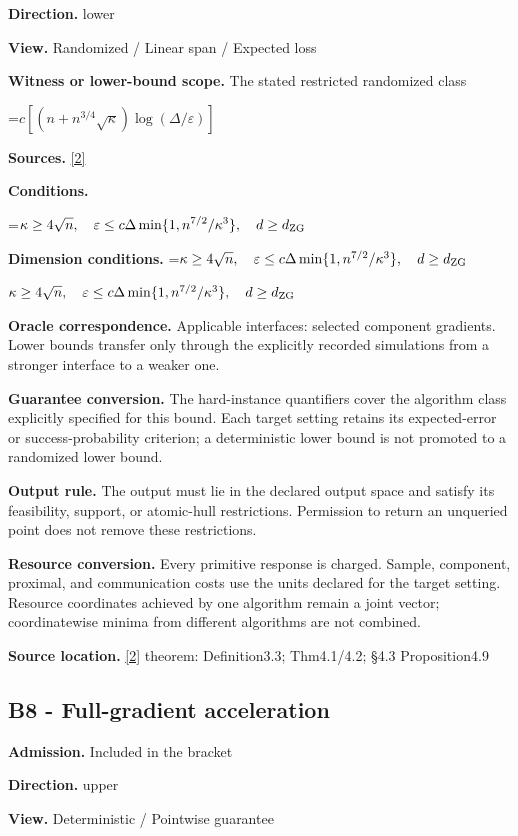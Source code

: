 \documentclass[10pt,a4paper]{article}
\newcommand{\AtlasMath}[1]{\par\begingroup\centering\setbox0=\hbox{$\displaystyle #1$}\ifdim\wd0>1.4\linewidth\typeout{ATLAS WIDE FORMULA: \the\wd0}\fi\ifdim\wd0>\linewidth\resizebox{\linewidth}{!}{\box0}\else\box0\fi\par\endgroup}
\newcommand{\AtlasInlineMath}[1]{\begingroup\setbox0=\hbox{$#1$}\ifdim\wd0>.4\linewidth\endgroup\AtlasMath{#1}\else\endgroup$#1$\fi}
\begin{document}
\textbf{Direction.} lower

\textbf{View.} Randomized / Linear span / Expected loss

\textbf{Witness or lower-bound scope.} The stated restricted randomized class

\AtlasMath{c[(n+n^{3/4}\sqrt\kappa)\log(\Delta/\varepsilon)]}
\textbf{Sources.} \href{https://proceedings.mlr.press/v97/zhou19b/zhou19b.pdf}{[2]}

\textbf{Conditions.} 
\AtlasMath{\kappa\ge4\sqrt n,\quad\varepsilon\le c\Delta\min\{1,n^{7/2}/\kappa^3\},\quad d\ge d_{\rm ZG}}


\textbf{Dimension conditions.} \AtlasInlineMath{\kappa\ge4\sqrt n,\quad\varepsilon\le c\Delta\min\{1,n^{7/2}/\kappa^3\},\quad d\ge d_{\rm ZG}}

\textbf{Oracle correspondence.} Applicable interfaces: selected component gradients. Lower bounds transfer only through the explicitly recorded simulations from a stronger interface to a weaker one.

\textbf{Guarantee conversion.} The hard-instance quantifiers cover the algorithm class explicitly specified for this bound. Each target setting retains its expected-error or success-probability criterion; a deterministic lower bound is not promoted to a randomized lower bound.

\textbf{Output rule.} The output must lie in the declared output space and satisfy its feasibility, support, or atomic-hull restrictions. Permission to return an unqueried point does not remove these restrictions.

\textbf{Resource conversion.} Every primitive response is charged. Sample, component, proximal, and communication costs use the units declared for the target setting. Resource coordinates achieved by one algorithm remain a joint vector; coordinatewise minima from different algorithms are not combined.

\textbf{Source location.} \href{https://proceedings.mlr.press/v97/zhou19b/zhou19b.pdf}{[2]} theorem: Definition3.3; Thm4.1/4.2; §4.3 Proposition4.9

\subsection{B8 - Full-gradient acceleration}
\textbf{Admission.} Included in the bracket

\textbf{Direction.} upper

\textbf{View.} Deterministic / Pointwise guarantee
\end{document}
